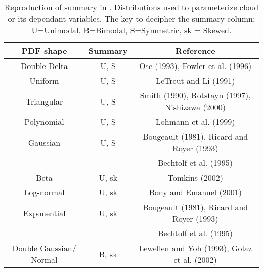 \begin{table}[]
    \centering
    \setlength\tabcolsep{1.5pt} %
    \setlength\extrarowheight{-7pt}
    \begin{tabular}{c|c|c}
        PDF shape &  Summary & Reference \\ \hline
        Double Delta & U, S & Ose (1993), Fowler et al. (1996) \\
        Uniform & U, S & LeTreut and Li (1991) \\
        Triangular & U, S & Smith (1990), Rotstayn (1997), Nishizawa (2000) \\
        Polynomial & U, S & Lohmann et al. (1999) \\
        Gaussian & U, S & Bougeault (1981), Ricard and Royer (1993) \\ 
        & &  Bechtolf et al. (1995) \\
        Beta & U, sk & Tomkins (2002) \\
        Log-normal & U, sk & Bony and Emanuel (2001) \\ 
        Exponential &  U, sk & Bougeault (1981), Ricard and Royer (1993) \\
        & &  Bechtolf et al. (1995) \\
        Double Gaussian/ Normal & B, sk & Lewellen and Yoh (1993), Golaz et al. (2002)
    \end{tabular}
    \caption{Reproduction of summary in \cite{Tompkins2009CloudParametrization}. Distributions used to parameterize cloud or its dependant variables. The key to decipher the summary column; U=Unimodal, B=Bimodal, S=Symmetric, sk = Skewed.}
    \label{tab:summary_PDF}
\end{table}